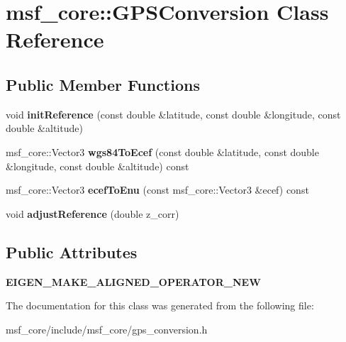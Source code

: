 \hypertarget{classmsf__core_1_1GPSConversion}{\section{msf\-\_\-core\-:\-:G\-P\-S\-Conversion Class Reference}
\label{classmsf__core_1_1GPSConversion}
}
\subsection*{Public Member Functions}
\begin{DoxyCompactItemize}
\item 
\hypertarget{classmsf__core_1_1GPSConversion_a5d4b6af72d1dbbf6f948ca39b020e6cd}{void {\bfseries init\-Reference} (const double \&latitude, const double \&longitude, const double \&altitude)}\label{classmsf__core_1_1GPSConversion_a5d4b6af72d1dbbf6f948ca39b020e6cd}

\item 
\hypertarget{classmsf__core_1_1GPSConversion_aeecd648087a584921a2372156b948b54}{msf\-\_\-core\-::\-Vector3 {\bfseries wgs84\-To\-Ecef} (const double \&latitude, const double \&longitude, const double \&altitude) const }\label{classmsf__core_1_1GPSConversion_aeecd648087a584921a2372156b948b54}

\item 
\hypertarget{classmsf__core_1_1GPSConversion_aa4a4410a1b149d99b41a6865034ba1d7}{msf\-\_\-core\-::\-Vector3 {\bfseries ecef\-To\-Enu} (const msf\-\_\-core\-::\-Vector3 \&ecef) const }\label{classmsf__core_1_1GPSConversion_aa4a4410a1b149d99b41a6865034ba1d7}

\item 
\hypertarget{classmsf__core_1_1GPSConversion_ae1c380b419236d93c266c89db9ba5a43}{void {\bfseries adjust\-Reference} (double z\-\_\-corr)}\label{classmsf__core_1_1GPSConversion_ae1c380b419236d93c266c89db9ba5a43}

\end{DoxyCompactItemize}
\subsection*{Public Attributes}
\begin{DoxyCompactItemize}
\item 
\hypertarget{classmsf__core_1_1GPSConversion_a5e8ca97d7f7c277ffba2dee4ebbc5092}{{\bfseries E\-I\-G\-E\-N\-\_\-\-M\-A\-K\-E\-\_\-\-A\-L\-I\-G\-N\-E\-D\-\_\-\-O\-P\-E\-R\-A\-T\-O\-R\-\_\-\-N\-E\-W}}\label{classmsf__core_1_1GPSConversion_a5e8ca97d7f7c277ffba2dee4ebbc5092}

\end{DoxyCompactItemize}


The documentation for this class was generated from the following file\-:\begin{DoxyCompactItemize}
\item 
msf\-\_\-core/include/msf\-\_\-core/gps\-\_\-conversion.\-h\end{DoxyCompactItemize}
